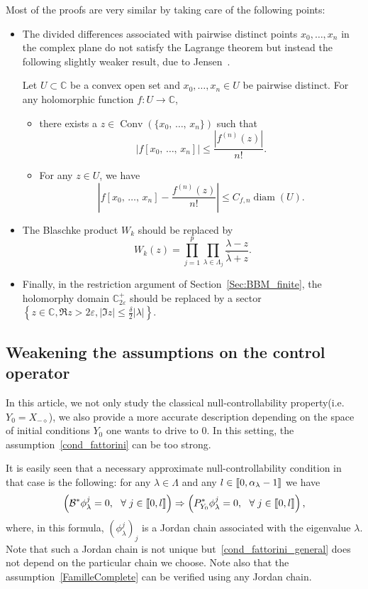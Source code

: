 \documentclass[AHL,Unicode,longabstracts]{cedram}
\DeclareMathOperator{\Conv}{Conv}
\newcommand{\llbracket}{\mathopen{[\mkern -2.7mu[}}
\newcommand{\rrbracket}{\mathclose{]\mkern -2.7mu]}}
\newcommand{\inter}[2]{\llbracket #1,#2 \rrbracket}
\newcommand\Bs{\mathcal{B}^*}
\newcommand{\Xmalpha}{X_{-\diamond}}
\newcommand{\Fzp}{Y_0}
\newcommand{\PFa}{P_{\Fzp}^*}
\newcommand{\C}{\mathbb{C}}
\newcommand{\Cpeps}{\mathbb{C}^+_{2\varepsilon}}
\DeclareMathOperator{\diam}{diam}
\let\oldforall\forall
\renewcommand*{\forall}{\mathrel{\oldforall}}
\begin{document}
Most of the proofs are very similar by taking care of the following points:
\begin{itemize}
\item The divided differences associated with pairwise distinct points $x_0,\dotsc,x_n$ in the complex plane do not satisfy the Lagrange theorem but instead the following slightly weaker result, due to Jensen~\cite{Jensen_1894}.
\begin{prop}
Let $U\subset \C$ be a convex open set and $x_0,\dotsc,x_n\in U$ be pairwise distinct. For any holomorphic function $f:U\to \C$,
\begin{itemize}
\item there exists a $z\in \Conv(\{x_0,\,\dotsc,\,x_n\})$ such that
\[
|f[x_0,\,\dotsc,\,x_n]| \leq \frac{\left|f^{(n)}(z)\right|}{n!}.
\]
\item For any $z\in U$, we have
\[
\left|f[x_0,\,\dotsc,\,x_n] - \frac{f^{(n)}(z)}{n!}\right| \leq C_{f,n} \diam(U).
\]
\end{itemize}
\end{prop}
\item The Blaschke product $W_k$ should be replaced by
\[
W_k(z)=\prod_{j=1}^p \prod_{\lambda\in \Lambda_j} \frac{\lambda - z}{\bar{\lambda} + z}.
\]
\item Finally, in the restriction argument of Section~\ref{Sec:BBM_finite}, the holomorphy domain $\Cpeps$ should be replaced by a sector $\left\{z\in \C, \Re z>2\varepsilon, |\Im z|\leq \frac{\delta}{2} |\lambda|\right\}$.
\end{itemize}


\subsection{Weakening the assumptions on the control operator} \label{Sec:Gestion_de_B*}

In this article, we not only study the classical null-controllability property\linebreak(i.e.$\Fzp=\Xmalpha$), we also provide a more accurate description depending on the space of initial conditions $\Fzp$ one wants to drive to $0$. In this setting, the assumption~\eqref{cond_fattorini} can be too strong.

It is easily seen that a necessary approximate null-controllability condition in that case is the following: for any $\lambda\in \Lambda$ and any $l\in \inter{0}{\alpha_\lambda-1}$ we have
\begin{equation}\label{cond_fattorini_general}
\left(\Bs \phi_\lambda^j=0, \ \ \forall j\in \inter{0}{l}\right) \Rightarrow \left(\PFa \phi_\lambda^j=0, \ \ \forall j\in\inter{0}{l}\right),
\end{equation}
where, in this formula, $(\phi_\lambda^j)_j$ is a Jordan chain associated with the eigenvalue $\lambda$. Note that such a Jordan chain is not unique but~\eqref{cond_fattorini_general} does not depend on the particular chain we choose. Note also that the assumption~\eqref{FamilleComplete} can be verified using any Jordan chain.
\end{document}
